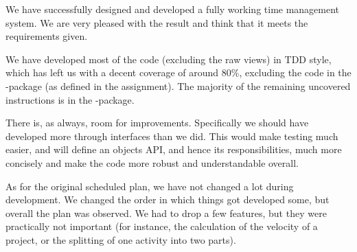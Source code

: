 We have successfully designed and developed a fully working time management system. We are very pleased with the result and think that it meets the requirements given. 

We have developed most of the code (excluding the raw views) in TDD style, which has left us with a decent coverage of around 80\%, excluding the code in the -package (as defined in the assignment). The majority of the remaining uncovered instructions is in the -package.

There is, as always, room for improvements. Specifically we should have developed more through interfaces than we did. This would make testing much easier, and will define an objects API, and hence its responsibilities, much more concisely and make the code more robust and understandable overall.

As for the original scheduled plan, we have not changed a lot during development. We changed the order in which things got developed some, but overall the plan was observed. We had to drop a few features, but they were practically not important (for instance, the calculation of the velocity of a project, or the splitting of one activity into two parts).
